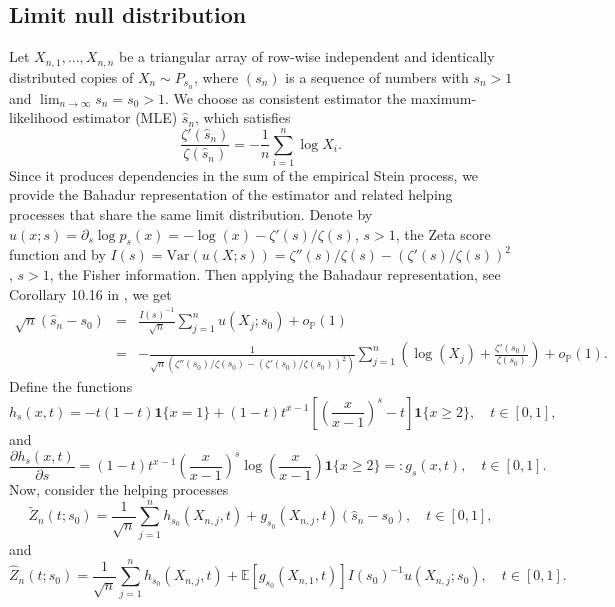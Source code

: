 \documentclass{article}
\theoremstyle{thm}
\theoremstyle{def}
\begin{document}
\subsection{Limit null distribution}
Let $X_{n,1},\ldots,X_{n,n}$ be a triangular array of row-wise independent and identically distributed copies of $X_n\sim P_{s_n}$, where $(s_n)$ is a sequence of numbers with $s_n>1$ and $\lim_{n\to\infty}s_n=s_0>1$.
We choose as consistent estimator the maximum-likelihood estimator (MLE) $\widehat{s}_n$,
which satisfies
\[
\frac{\zeta'(\widehat{s}_n)}{\zeta(\widehat{s}_n)} = - \frac{1}{n}\sum_{i=1}^n \log X_i.
\]
Since it produces dependencies in the sum of the empirical Stein process, we provide the Bahadur representation of the estimator and related helping processes that share the same limit distribution. Denote by \(u(x;s) = \partial_s \log p_s(x)=-\log(x)-\zeta'(s)/\zeta(s)\), $s>1$, the Zeta score function and by \(I(s) = \mathrm{Var}(u(X;s))=\zeta''(s)/\zeta(s)-\left(\zeta'(s)/\zeta(s)\right)^2\), $s>1$, the Fisher information. Then applying the Bahadaur representation, see Corollary 10.16 in \cite{H:2024}, we get
\begin{eqnarray}\nonumber
    \sqrt{n}(\widehat{s}_n-s_0)&=&\frac{I(s)^{-1}}{\sqrt{n}}\sum_{j=1}^nu(X_j;s_0) +o_{\mathbb{P}}(1)\\
    &=&-\frac{1}{\sqrt{n}\left(\zeta''(s_0)/\zeta(s_0)-\left(\zeta'(s_0)/\zeta(s_0)\right)^2\right)}\sum_{j=1}^n\left(\log(X_j)+ \frac{\zeta'(s_0)}{\zeta(s_0)}\right)+o_{\mathbb{P}}(1).\label{eq:BRMLE}
\end{eqnarray}
Define the functions
\begin{equation}\label{eq:hs}
    h_s(x,t)=-t(1-t)\mathbf{1}\{x=1\}+(1-t)t^{x-1}\left[\left(\frac{x}{x-1}\right)^{s}-t\right]\mathbf{1}\{x\ge2\},\quad t\in[0,1],
\end{equation}
and
\begin{equation}
    \frac{\partial h_s(x,t)}{\partial s}=(1-t)t^{x-1}\left(\frac{x}{x-1}\right)^{s}\log\left(\frac x{x-1}\right)\mathbf{1}\{x\ge2\}=:g_s(x,t),\quad t\in[0,1].
\end{equation}
Now, consider the helping processes
\begin{equation}
\widetilde{Z}_n(t;s_0)=\frac1{\sqrt{n}}\sum_{j=1}^nh_{s_0}(X_{n,j},t)+g_{s_0}(X_{n,j},t)(\widehat{s}_n-s_0),\quad t\in[0,1],
\end{equation}
and
\begin{equation}
\widehat{Z}_n(t;s_0)=\frac1{\sqrt{n}}\sum_{j=1}^nh_{s_0}(X_{n,j},t)+\mathbb{E}\left[g_{s_0}(X_{n,1},t)\right]I(s_0)^{-1}u(X_{n,j};s_0),\quad t\in[0,1].
\end{equation}
\end{document}
